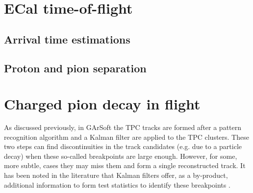 \section{ECal time-of-flight}

\subsection{Arrival time estimations}

\subsection{Proton and pion separation}

\section{Charged pion decay in flight}

As discussed previously, in GArSoft the TPC tracks are formed after a pattern recognition algorithm and a Kalman filter are applied to the TPC clusters. These two steps can find discontinuities in the track candidates (e.g. due to a particle decay) when these so-called breakpoints are large enough. However, for some, more subtle, cases they may miss them and form a single reconstructed track. It has been noted in the literature that Kalman filters offer, as a by-product, additional information to form test statistics to identify these breakpoints \cite{Fruehwirth1988,Astier2000}.

